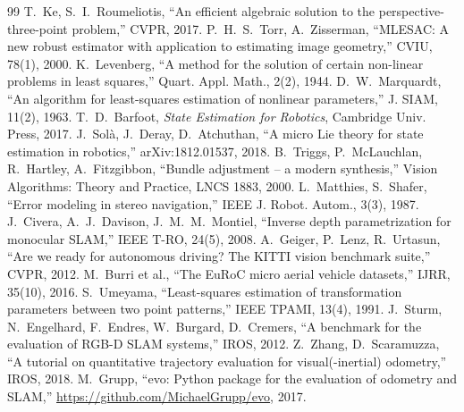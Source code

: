 \documentclass[11pt,a4paper]{article}
\begin{document}
\begin{thebibliography}{99}
 T.~Ke, S.~I.~Roumeliotis, ``An efficient algebraic solution to the perspective-three-point problem,'' CVPR, 2017.
 P.~H.~S.~Torr, A.~Zisserman, ``MLESAC: A new robust estimator with application to estimating image geometry,'' CVIU, 78(1), 2000.
 K.~Levenberg, ``A method for the solution of certain non-linear problems in least squares,'' Quart. Appl. Math., 2(2), 1944.
 D.~W.~Marquardt, ``An algorithm for least-squares estimation of nonlinear parameters,'' J. SIAM, 11(2), 1963.
 T.~D.~Barfoot, \emph{State Estimation for Robotics}, Cambridge Univ. Press, 2017.
 J.~Sol\`a, J.~Deray, D.~Atchuthan, ``A micro Lie theory for state estimation in robotics,'' arXiv:1812.01537, 2018.
 B.~Triggs, P.~McLauchlan, R.~Hartley, A.~Fitzgibbon, ``Bundle adjustment -- a modern synthesis,'' Vision Algorithms: Theory and Practice, LNCS 1883, 2000.
 L.~Matthies, S.~Shafer, ``Error modeling in stereo navigation,'' IEEE J. Robot. Autom., 3(3), 1987.
 J.~Civera, A.~J.~Davison, J.~M.~M.~Montiel, ``Inverse depth parametrization for monocular SLAM,'' IEEE T-RO, 24(5), 2008.
 A.~Geiger, P.~Lenz, R.~Urtasun, ``Are we ready for autonomous driving? The KITTI vision benchmark suite,'' CVPR, 2012.
 M.~Burri et al., ``The EuRoC micro aerial vehicle datasets,'' IJRR, 35(10), 2016.
 S.~Umeyama, ``Least-squares estimation of transformation parameters between two point patterns,'' IEEE TPAMI, 13(4), 1991.
 J.~Sturm, N.~Engelhard, F.~Endres, W.~Burgard, D.~Cremers, ``A benchmark for the evaluation of RGB-D SLAM systems,'' IROS, 2012.
 Z.~Zhang, D.~Scaramuzza, ``A tutorial on quantitative trajectory evaluation for visual(-inertial) odometry,'' IROS, 2018.
 M.~Grupp, ``evo: Python package for the evaluation of odometry and SLAM,'' \url{https://github.com/MichaelGrupp/evo}, 2017.
\end{thebibliography}
\endgroup

\clearpage
\appendix
\end{document}

